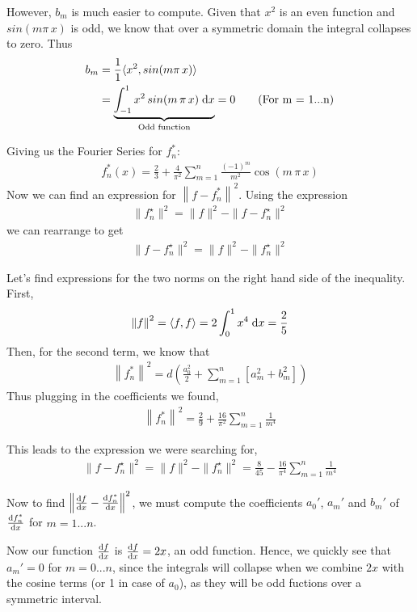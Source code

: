 \documentclass[12pt]{article}
\newcommand{\dx}{\; {\rm d}x}
\newcommand{\dfdx}{\frac{{\rm d}f}{{\rm d}x}}
\newcommand{\dfstardx}{\frac{{\rm d}f_n^*}{{\rm d}x}}
\newcommand{\inprod}[2]{\langle #1, #2 \rangle}
\newcommand{\norm}[1]{\left\|#1\right\|}
\newcommand{\integ}[1]{\int_{-#1}^#1}
\newcommand{\intzero}[1]{\int_{0}^#1}
\begin{document}
However, $b_m$ is much easier to compute. Given that $x^2$ is an even function and $sin(m\pi\,x)$ is odd,
we know that over a symmetric domain the integral collapses to zero. Thus
\begin{align}
		b_m &= \frac{1}{1}\inprod{x^2}{sin(m\pi\,x)}\\
			&= \underbrace{\integ{1} x^2\,sin(m\,\pi\,x) \dx}_{\text{Odd function}}
			= 0 \tag{For m = 1...n}
\end{align}

Giving us the Fourier Series for $f_n^*$:
\begin{align}
	f_n^*(x) = \frac{2}{3} + \frac{4}{\pi^2}\sum_{m=1}^n
			\frac{(-1)^m}{m^2} \cos(m\,\pi\,x)
\end{align}
Now we can find an expression for $\norm{f - f_n^*}^2$. Using the expression
\begin{align}
	\|f_n^\star\|^2 = \|f\|^2 - \|f-f_n^\star\|^2
\end{align}
we can rearrange to get
\begin{align}
	\|f-f_n^\star\|^2 = \|f\|^2 - \|f_n^\star\|^2 
\end{align}

Let's find expressions for the two norms on the right hand side of the inequality.
First,
\begin{align}
	\norm{f}^2 = \inprod{f}{f} = 2 \intzero{1} x^4 \dx = \frac{2}{5}
\end{align}
Then, for the second term, we know that
\begin{align}
	\norm{f_n^*}^2 = d\left(\frac{a_0^2}{2} + \sum_{m=1}^n [a_m^2 + b_m^2]\right)
\end{align}
Thus plugging in the coefficients we found,
\begin{align}
		\norm{f_n^*}^2 = \frac{2}{9} + \frac{16}{\pi^2}\sum_{m=1}^n \frac{1}{m^4}
\end{align}

This leads to the expression we were searching for,
\begin{align}
	\|f-f_n^\star\|^2 = \|f\|^2 - \|f_n^\star\|^2 = \frac{8}{45} - \frac{16}{\pi^4} \sum_{m=1}^n \frac{1}{m^4}
\end{align}

Now to find $\left\| \dfdx - \dfstardx \right\|^2$, we must compute the coefficients $a_0'$, $a_m'$ and $b_m'$ of $\dfstardx$ for $m = 1...n$.

Now our function $\dfdx$ is $\dfdx = 2x$, an odd function. Hence, we quickly see that $a_m' = 0$ for $m = 0...n$, since the integrals will collapse when we combine $2x$ with the cosine terms (or 1 in case of $a_0$), as they will be odd fuctions over a symmetric interval.
\end{document}
